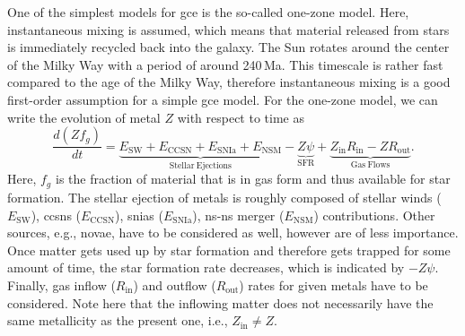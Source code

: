 One of the simplest models for \ac{gce} is the so-called one-zone model. Here, instantaneous mixing is assumed, which means that material released from stars is immediately recycled back into the galaxy. The Sun rotates around the center of the Milky Way with a period of around 240\,Ma. This timescale is rather fast compared to the age of the Milky Way, therefore instantaneous mixing is a good first-order assumption for a simple \ac{gce} model. For the one-zone model, we can write the evolution of metal $Z$ with respect to time as
\begin{equation}
    \frac{d(Zf_g)}{dt} = \underbrace{E_\mathrm{SW} + E_\mathrm{CCSN} + E_\mathrm{SNIa} + E_\mathrm{NSM}}_{\mathrm{Stellar\  Ejections}} - \underbrace{Z\psi}_{\mathrm{SFR}} + \underbrace{Z_\mathrm{in} R_\mathrm{in} - Z R_\mathrm{out}}_{\mathrm{Gas\ Flows}}.
\end{equation}
Here, $f_g$ is the fraction of material that is in gas form and thus available for star formation. The stellar ejection of metals is roughly composed of stellar winds ($E_\mathrm{SW}$), \acp{ccsn} ($E_\mathrm{CCSN}$), \acp{snia} ($E_\mathrm{SNIa}$), \ac{ns}-\ac{ns} merger ($E_\mathrm{NSM}$) contributions. Other sources, e.g., novae, have to be considered as well, however are of less importance. Once matter gets used up by star formation and therefore gets trapped for some amount of time, the star formation rate decreases, which is indicated by $-Z\psi$. Finally, gas inflow ($R_\mathrm{in}$) and outflow ($R_\mathrm{out}$) rates for given metals have to be considered. Note here that the inflowing matter does not necessarily have the same metallicity as the present one, i.e., $Z_\mathrm{in} \neq Z$.

